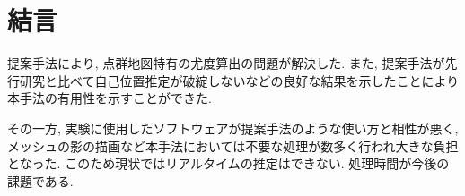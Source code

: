 \documentclass[letterpaper, 9 pt, conference]{ieeeconf}
\begin{document}
\section{結言}
提案手法により, 点群地図特有の尤度算出の問題が解決した. また, 提案手法が先行研究と比べて自己位置推定が破綻しないなどの良好な結果を示したことにより本手法の有用性を示すことができた. \par その一方, 実験に使用したソフトウェアが提案手法のような使い方と相性が悪く, メッシュの影の描画など本手法においては不要な処理が数多く行われ大きな負担となった. このため現状ではリアルタイムの推定はできない. 処理時間が今後の課題である.



\end{document}
